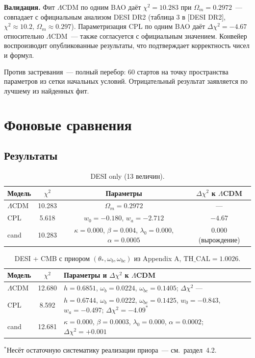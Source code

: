 \documentclass[11pt,a4paper]{article}
\begin{document}
\textbf{Валидация.} Фит $\Lambda$CDM по одним BAO даёт $\chi^2=10.283$ при $\Omega_m=0.2972$~--- совпадает с официальным анализом DESI DR2 (таблица 3 в [DESI DR2], $\chi^2\approx10.2$, $\Omega_m\approx0.297$). Параметризация CPL по одним BAO даёт $\Delta\chi^2=-4.67$ относительно $\Lambda$CDM~--- также согласуется с официальным значением. Конвейер воспроизводит опубликованные результаты, что подтверждает корректность чисел и формул.

Против застревания~--- полный перебор: 60 стартов на точку пространства параметров из сетки начальных условий. Отрицательный результат заявляется по лучшему из найденных фит.

\section{Фоновые сравнения}

\subsection{Результаты}

\begin{table}[h]
\centering
\small
\caption{DESI only (13 величин).}
\begin{tabular}{lccc}
\toprule
Модель & $\chi^2$ & Параметры & $\Delta\chi^2$ к $\Lambda$CDM \\
\midrule
$\Lambda$CDM & 10.283 & $\Omega_m=0.2972$ & --- \\
CPL & 5.618 & $w_0=-0.180$, $w_a=-2.712$ & $-4.67$ \\
cand & 10.283 & $\kappa=0.000$, $\beta=0.004$, $\lambda_0=0.000$, $\alpha=0.0005$ & 0.000 (вырождение) \\
\bottomrule
\end{tabular}
\end{table}

\begin{table}[h]
\centering
\small
\caption{DESI + CMB с приором $(\theta_*,\omega_b,\omega_{bc})$ из Appendix A, $\mathrm{TH\_CAL}=1.0026$.}
\begin{tabular}{lcp{7.5cm}}
\toprule
Модель & $\chi^2$ & Параметры и $\Delta\chi^2$ к $\Lambda$CDM \\
\midrule
$\Lambda$CDM & 12.680 & $h=0.6851$, $\omega_b=0.0224$, $\omega_{bc}=0.1405$; $\Delta\chi^2$ --- \\
CPL & 8.592 & $h=0.6744$, $\omega_b=0.0222$, $\omega_{bc}=0.1425$, $w_0=-0.843$, $w_a=-0.497$; $\Delta\chi^2=-4.09^*$ \\
cand & 12.681 & $\kappa=0.000$, $\beta=0.0003$, $\lambda_0=0.000$, $\alpha=0.0002$; $\Delta\chi^2=+0.001$ \\
\bottomrule
\end{tabular}
\par\smallskip
\footnotesize $^*$Несёт остаточную систематику реализации приора~--- см.\ раздел~4.2.
\end{table}
\end{document}
